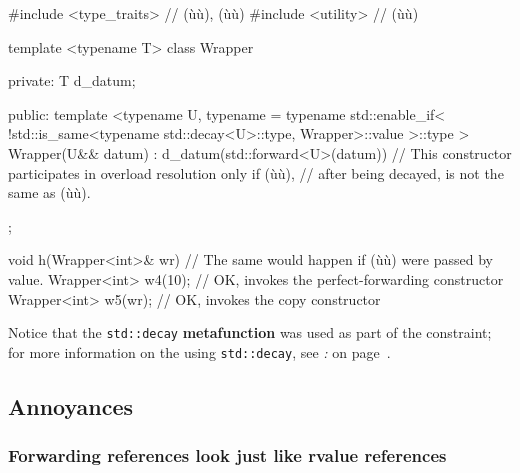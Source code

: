 \begin{emcppshiddenlisting}[emcppsbatch=e19]
#include <type_traits>  // (ù{}ù), (ù{}ù)
#include <utility>  // (ù{}ù)
\end{emcppshiddenlisting}
\begin{emcppslisting}[emcppsbatch=e19]
template <typename T>
class Wrapper
{
private:
    T d_datum;

public:
    template <typename U,
        typename = typename std::enable_if<
            !std::is_same<typename std::decay<U>::type, Wrapper>::value
        >::type
    >
    Wrapper(U&& datum) : d_datum(std::forward<U>(datum)) { }
        // This constructor participates in overload resolution only if (ù{}ù),
        // after being decayed, is not the same as (ù{}ù).
};

void h(Wrapper<int>& wr)  // The same would happen if (ù{}ù) were passed by value.
{
    Wrapper<int> w4(10);  // OK, invokes the perfect-forwarding constructor
    Wrapper<int> w5(wr);  // OK, invokes the copy constructor
}
\end{emcppslisting}

\noindent Notice that the \texttt{std::decay} \textbf{metafunction} was used as
part of the constraint; for more information on the using
\texttt{std::decay}, see \textit{: } on page~\pageref{metafunctions-are-required-in-constraints}.

\subsection[Annoyances]{Annoyances}\label{annoyances-forwardingref}

\subsubsection[Forwarding references look just like rvalue references]{Forwarding references look just like rvalue references}\label{forwarding-references-look-just-like-rvalue-references}

